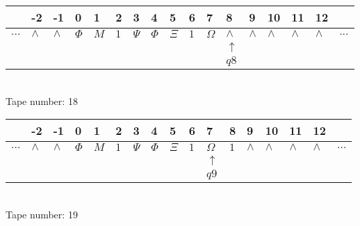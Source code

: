 \documentclass{article}
\begin{document}
\begin{table}[H]
\centering
\begin{tabular}{lllllllllllllllll}
 & -2 & -1 & 0 & 1 & 2 & 3 & 4 & 5 & 6 & 7 & 8 & 9 & 10 & 11 & 12 & \\
\hline
$...$ & \multicolumn{1}{|l|}{$\wedge$} & \multicolumn{1}{|l|}{$\wedge$} & \multicolumn{1}{|l|}{$\Phi$} & \multicolumn{1}{|l|}{$M$} & \multicolumn{1}{|l|}{$1$} & \multicolumn{1}{|l|}{$\Psi$} & \multicolumn{1}{|l|}{$\Phi$} & \multicolumn{1}{|l|}{$\Xi$} & \multicolumn{1}{|l|}{$1$} & \multicolumn{1}{|l|}{$\Omega$} & \multicolumn{1}{|l|}{$\wedge$} & \multicolumn{1}{|l|}{$\wedge$} & \multicolumn{1}{|l|}{$\wedge$} & \multicolumn{1}{|l|}{$\wedge$} & \multicolumn{1}{|l|}{$\wedge$} & $...$\\
\hline
&  &  &  &  &  &  &  &  &  &  & $\uparrow$ &  &  &  &  &  \\
&  &  &  &  &  &  &  &  &  &  & $ q8 $ &  &  &  &  &  \\
\end{tabular}
\\
Tape number: 18
\noindent\makebox[\linewidth]{\hdashrule{\textwidth}{1pt}{1pt}}\end{table}

\begin{table}[H]
\centering
\begin{tabular}{lllllllllllllllll}
 & -2 & -1 & 0 & 1 & 2 & 3 & 4 & 5 & 6 & 7 & 8 & 9 & 10 & 11 & 12 & \\
\hline
$...$ & \multicolumn{1}{|l|}{$\wedge$} & \multicolumn{1}{|l|}{$\wedge$} & \multicolumn{1}{|l|}{$\Phi$} & \multicolumn{1}{|l|}{$M$} & \multicolumn{1}{|l|}{$1$} & \multicolumn{1}{|l|}{$\Psi$} & \multicolumn{1}{|l|}{$\Phi$} & \multicolumn{1}{|l|}{$\Xi$} & \multicolumn{1}{|l|}{$1$} & \multicolumn{1}{|l|}{$\Omega$} & \multicolumn{1}{|l|}{$1$} & \multicolumn{1}{|l|}{$\wedge$} & \multicolumn{1}{|l|}{$\wedge$} & \multicolumn{1}{|l|}{$\wedge$} & \multicolumn{1}{|l|}{$\wedge$} & $...$\\
\hline
&  &  &  &  &  &  &  &  &  & $\uparrow$ &  &  &  &  &  &  \\
&  &  &  &  &  &  &  &  &  & $ q9 $ &  &  &  &  &  &  \\
\end{tabular}
\\
Tape number: 19
\noindent\makebox[\linewidth]{\hdashrule{\textwidth}{1pt}{1pt}}\end{table}
\end{document}
